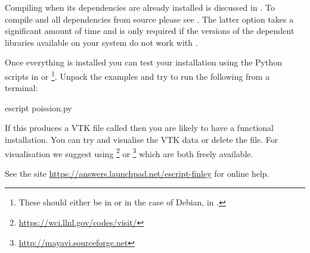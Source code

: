 Compiling \esfinley when its dependencies are already installed is discussed in .
To compile \esfinley and all dependencies from source please see .
The latter option takes a significant amount of time and is only required if the versions of the dependent libraries available on your system do not work with \esfinley.

Once everything is installed you can test your installation using the Python scripts in  or \footnote{These should either be in  or in the case of Debian, in .}.
Unpack the examples and try to run the following from a terminal:
\begin{shellCode}
 escript poission.py
\end{shellCode}
If this produces a VTK file called  then you are likely to have a functional \esfinley installation.
You can try and visualise the VTK data or delete the file.
For visualisation we suggest using \footnote{\url{https://wci.llnl.gov/codes/visit/}} or \footnote{\url{http://mayavi.sourceforge.net}} which are both freely available.

See the site \url{https://answers.launchpad.net/escript-finley} for online help.
